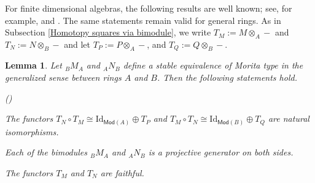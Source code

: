 \documentclass[12pt,twoside]{amsart}
\theoremstyle{bfupright head,slanted body}
\theoremstyle{bfupright head,upright body}
\theoremstyle{fixed bf head,slanted body}
\newtheorem{lem}[res]{Lemma}            \newtheorem*{lem*}{Lemma}
\theoremstyle{fixed bf head,upright body}
\theoremstyle{numbered paragraph}
\newlength{\thmlistleft}        %
\newlength{\thmlistright}       %
\newlength{\thmlistpartopsep}   %
\newlength{\thmlisttopsep}      %
\newlength{\thmlistparsep}      %
\newlength{\thmlistitemsep}     %
\newcounter{prt}
\newenvironment{prt}{\begin{list}{\upshape (\alph{prt})}%
    {\usecounter{prt}%
      \setlength{\leftmargin}{\thmlistleft}%
      \setlength{\labelwidth}{\thmlistleft}%
      \setlength{\rightmargin}{\thmlistright}%
      \setlength{\partopsep}{\thmlistpartopsep}%
      \setlength{\topsep}{\thmlisttopsep}%
      \setlength{\parsep}{\thmlistparsep}%
      \setlength{\itemsep}{\thmlistitemsep}}}%
  {\end{list}}%
\newcommand{\thmcite}[2][?]{\cite[Theorem~#1]{#2}}
\newcommand{\lemcite}[2][?]{\cite[Lemma~#1]{#2}}
\numberwithin{equation}{res}
\newcommand{\Mod}{\mathsf{Mod}}
\newcommand{\Id}{\mathrm{Id}}
\begin{document}
For finite dimensional algebras, the following results are well known; see, for example, \thmcite[4.1]{2002Xi} and \lemcite[2.2]{2003Liu}. The same statements remain valid for general rings. As in Subsection \ref{Homotopy squares via bimodule}, we write \(T_M:=M\otimes_A-\) and \(T_N:=N\otimes_B-\) and let \(T_P:=P\otimes_A-\), and \(T_Q:=Q\otimes_B-\).

\begin{lem} \label{Stable equivalences resules}
Let \({}_BM_A\) and \({}_AN_B\) define a stable equivalence of Morita type in the generalized sense between rings \(A\) and \(B\).
Then the following statements hold.
\begin{prt}
\item The functors
$T_N\circ T_M \cong \Id_{\Mod(A)}\oplus T_P$
and
$T_M\circ T_N \cong \Id_{\Mod(B)}\oplus T_Q$
are natural isomorphisms.
\item Each of the bimodules \({}_BM_A\) and \({}_AN_B\) is a projective generator on both sides.
\item The functors \(T_M\) and \(T_N\) are faithful.
\end{prt}
\end{lem}
\end{document}

